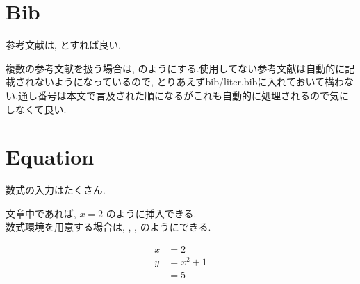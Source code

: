 \section{Bib}
参考文献は, \cite{visAssessmentApproachesLogistics2016}とすれば良い.

複数の参考文献を扱う場合は, \cite{visAssessmentApproachesLogistics2016, aitallaStudyNewInstallation2017}のようにする.使用してない参考文献は自動的に記載されないようになっているので, とりあえずbib/liter.bibに入れておいて構わない.通し番号は本文で言及された順になるがこれも自動的に処理されるので気にしなくて良い\cite{aitallaStudyNewInstallation2017}.

\section{Equation}
数式の入力はたくさん.

文章中であれば, $x = 2$ のように挿入できる.\\
数式環境を用意する場合は, , , のようにできる.

\begin{align}
    x &= 2 \label{eq:sample1}\\
    y &= x^2 + 1 \label{eq:sample2}\\
      &= 5 \label{eq:sample3}
\end{align}